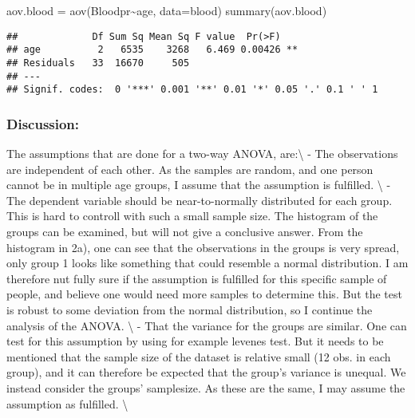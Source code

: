 \documentclass[
]{article}
\newenvironment{Shaded}{\begin{snugshade}}{\end{snugshade}}
\newcommand{\AttributeTok}[1]{\textcolor[rgb]{0.77,0.63,0.00}{#1}}
\newcommand{\FunctionTok}[1]{\textcolor[rgb]{0.00,0.00,0.00}{#1}}
\newcommand{\NormalTok}[1]{#1}
\newcommand{\OtherTok}[1]{\textcolor[rgb]{0.56,0.35,0.01}{#1}}
\newcommand{\SpecialCharTok}[1]{\textcolor[rgb]{0.00,0.00,0.00}{#1}}
\begin{document}
\begin{Shaded}
\begin{Highlighting}[]
\NormalTok{aov.blood }\OtherTok{=} \FunctionTok{aov}\NormalTok{(Bloodpr}\SpecialCharTok{\textasciitilde{}}\NormalTok{age, }\AttributeTok{data=}\NormalTok{blood)}
\FunctionTok{summary}\NormalTok{(aov.blood)}
\end{Highlighting}
\end{Shaded}

\begin{verbatim}
##             Df Sum Sq Mean Sq F value  Pr(>F)   
## age          2   6535    3268   6.469 0.00426 **
## Residuals   33  16670     505                   
## ---
## Signif. codes:  0 '***' 0.001 '**' 0.01 '*' 0.05 '.' 0.1 ' ' 1
\end{verbatim}

\hypertarget{discussion-4}{%
\subsubsection{Discussion:}\label{discussion-4}}

The assumptions that are done for a two-way ANOVA, are:\textbackslash{}
- The observations are independent of each other. As the samples are
random, and one person cannot be in multiple age groups, I assume that
the assumption is fulfilled. \textbackslash{} - The dependent variable
should be near-to-normally distributed for each group. This is hard to
controll with such a small sample size. The histogram of the groups can
be examined, but will not give a conclusive answer. From the histogram
in 2a), one can see that the observations in the groups is very spread,
only group 1 looks like something that could resemble a normal
distribution. I am therefore nut fully sure if the assumption is
fulfilled for this specific sample of people, and believe one would need
more samples to determine this. But the test is robust to some deviation
from the normal distribution, so I continue the analysis of the ANOVA.
\textbackslash{} - That the variance for the groups are similar. One can
test for this assumption by using for example levenes test. But it needs
to be mentioned that the sample size of the dataset is relative small
(12 obs. in each group), and it can therefore be expected that the
group's variance is unequal. We instead consider the groups' samplesize.
As these are the same, I may assume the assumption as fulfilled.
\textbackslash{}
\end{document}
